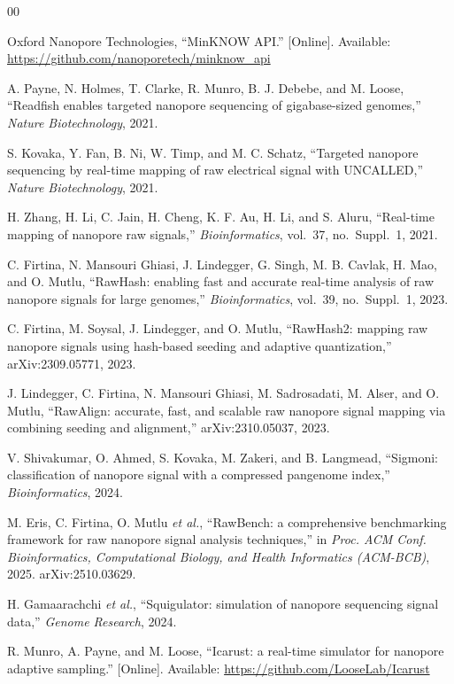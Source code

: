 \documentclass[conference]{IEEEtran}
\begin{document}
\begin{thebibliography}{00}

 Oxford Nanopore Technologies, ``MinKNOW API.'' [Online]. Available:
\url{https://github.com/nanoporetech/minknow_api}

 A. Payne, N. Holmes, T. Clarke, R. Munro, B. J. Debebe, and M. Loose,
``Readfish enables targeted nanopore sequencing of gigabase-sized genomes,'' \emph{Nature
Biotechnology}, 2021.

 S. Kovaka, Y. Fan, B. Ni, W. Timp, and M. C. Schatz, ``Targeted nanopore
sequencing by real-time mapping of raw electrical signal with UNCALLED,'' \emph{Nature
Biotechnology}, 2021.

 H. Zhang, H. Li, C. Jain, H. Cheng, K. F. Au, H. Li, and S. Aluru,
``Real-time mapping of nanopore raw signals,'' \emph{Bioinformatics}, vol.~37,
no.~Suppl.~1, 2021.

 C. Firtina, N. Mansouri Ghiasi, J. Lindegger, G. Singh, M. B. Cavlak,
H. Mao, and O. Mutlu, ``RawHash: enabling fast and accurate real-time analysis of raw
nanopore signals for large genomes,'' \emph{Bioinformatics}, vol.~39, no.~Suppl.~1, 2023.

 C. Firtina, M. Soysal, J. Lindegger, and O. Mutlu, ``RawHash2: mapping raw
nanopore signals using hash-based seeding and adaptive quantization,'' arXiv:2309.05771, 2023.

 J. Lindegger, C. Firtina, N. Mansouri Ghiasi, M. Sadrosadati, M. Alser,
and O. Mutlu, ``RawAlign: accurate, fast, and scalable raw nanopore signal mapping via
combining seeding and alignment,'' arXiv:2310.05037, 2023.

 V. Shivakumar, O. Ahmed, S. Kovaka, M. Zakeri, and B. Langmead, ``Sigmoni:
classification of nanopore signal with a compressed pangenome index,''
\emph{Bioinformatics}, 2024.

 M. Eris, C. Firtina, O. Mutlu \emph{et al.}, ``RawBench: a comprehensive
benchmarking framework for raw nanopore signal analysis techniques,'' in \emph{Proc. ACM
Conf. Bioinformatics, Computational Biology, and Health Informatics (ACM-BCB)}, 2025.
arXiv:2510.03629.

 H. Gamaarachchi \emph{et al.}, ``Squigulator: simulation of nanopore
sequencing signal data,'' \emph{Genome Research}, 2024.

 R. Munro, A. Payne, and M. Loose, ``Icarust: a real-time simulator for
nanopore adaptive sampling.'' [Online]. Available: \url{https://github.com/LooseLab/Icarust}


\end{thebibliography}
\end{document}

